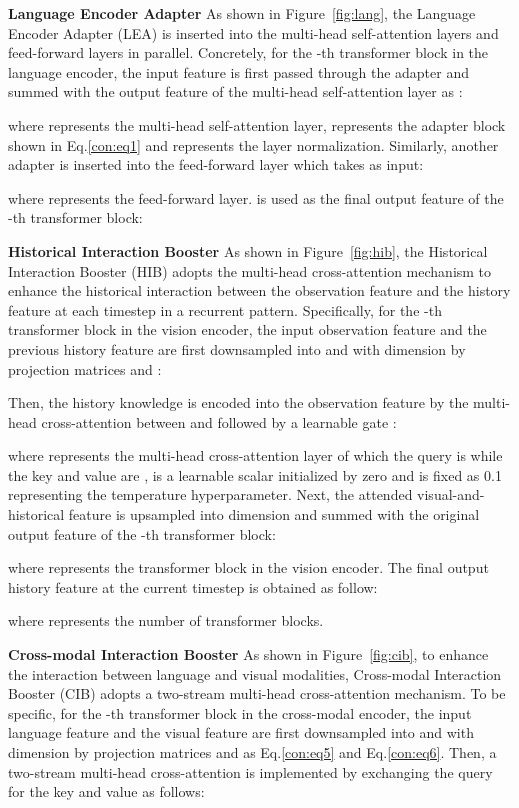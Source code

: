 \documentclass[10pt,twocolumn,letterpaper]{article}
\begin{document}
\noindent\textbf{Language Encoder Adapter}
As shown in Figure~\ref{fig:lang}, the Language Encoder Adapter (LEA) is inserted into the multi-head self-attention layers and feed-forward layers in parallel. 
Concretely, for the -th transformer block in the language encoder, the input feature  is first passed through the adapter 
and summed with the output feature of the multi-head self-attention layer as :

where  represents the multi-head self-attention layer,  represents the adapter block shown in Eq.\ref{con:eq1} and  represents the layer normalization. 
Similarly, another adapter is inserted into the feed-forward layer which takes  as input:

where  represents the feed-forward layer.  is used as the final output feature  of the -th transformer block:


\noindent\textbf{Historical Interaction Booster}
As shown in Figure~\ref{fig:hib}, the Historical Interaction Booster (HIB) adopts the multi-head cross-attention mechanism to enhance the historical interaction between the observation feature and the history feature at each timestep  in a recurrent pattern.
Specifically, for the -th transformer block in the vision encoder, the input observation feature  and the previous history feature  are first downsampled into  and  with  dimension by projection matrices  and :

Then, the history knowledge is encoded into the observation feature by the multi-head cross-attention between  and  followed by a learnable gate : 

where  represents the multi-head cross-attention layer of which the query is  while the key and value are ,  is a learnable scalar initialized by zero and  is fixed as 0.1 representing the temperature hyperparameter. 
Next, the attended visual-and-historical feature  is upsampled into  dimension and summed with the original output feature  of the -th transformer block:

where  represents the transformer block in the vision encoder. 
The final output history feature  at the current timestep  is obtained as follow:

where  represents the number of transformer blocks.


\noindent\textbf{Cross-modal Interaction Booster}
As shown in Figure~\ref{fig:cib}, to enhance the interaction between language and visual modalities, Cross-modal Interaction Booster (CIB) adopts a two-stream multi-head cross-attention mechanism. 
To be specific, for the -th transformer block in the cross-modal encoder, the input language feature  and the visual feature  are first downsampled into   and  with  dimension by projection matrices  and  as Eq.\ref{con:eq5} and Eq.\ref{con:eq6}. Then, a two-stream multi-head cross-attention is implemented by exchanging the query for the key and value as follows:
\end{document}
